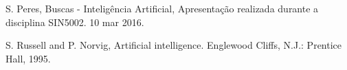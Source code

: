 \documentclass[conference]{IEEEtran}
\begin{document}









%
%
%
\begin{thebibliography}{1}

\bibitem{}
S. Peres, Buscas - Inteligência Artificial, Apresentação realizada durante a disciplina SIN5002. 10 mar 2016.


\bibitem{}
S. Russell and P. Norvig, Artificial intelligence. Englewood Cliffs, N.J.: Prentice Hall, 1995.

\end{thebibliography}




\end{document}
